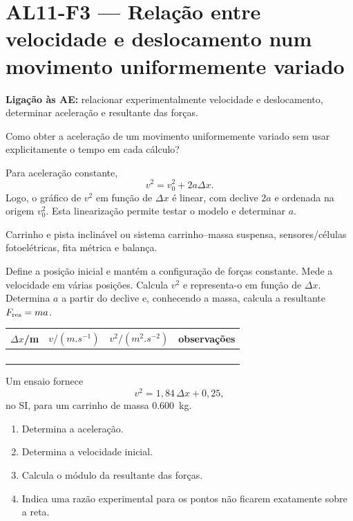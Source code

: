 \documentclass[11pt,a4paper,openany]{book}
\newcounter{exercicio}[chapter]
\renewcommand{\theexercicio}{\thechapter.\arabic{exercicio}}
\newenvironment{exercicio}[1][]%
{\refstepcounter{exercicio}%
\begin{tcolorbox}[breakable,colback=white,colframe=eublue!70,
 title={Exercício \theexercicio\if\relax\detokenize{#1}\relax\else\ --- #1\fi},fonttitle=\bfseries]}%
{\end{tcolorbox}}
\newcommand{\LigAE}[1]{\textbf{Ligação às AE:} #1}
\begin{document}
\section{AL11-F3 — Relação entre velocidade e deslocamento num movimento uniformemente variado}
\LigAE{relacionar experimentalmente velocidade e deslocamento, determinar aceleração e resultante das forças.}

\begin{questao}
Como obter a aceleração de um movimento uniformemente variado sem usar explicitamente o tempo em cada cálculo?
\end{questao}

\begin{fundamento}
Para aceleração constante,
\[
v^2=v_0^2+2a\Delta x.
\]
Logo, o gráfico de $v^2$ em função de $\Delta x$ é linear, com declive $2a$ e ordenada na origem $v_0^2$. Esta linearização permite testar o modelo e determinar $a$.
\end{fundamento}

\begin{material}
Carrinho e pista inclinável ou sistema carrinho--massa suspensa, sensores/células fotoelétricas, fita métrica e balança.
\end{material}

\begin{metodo}
Define a posição inicial e mantém a configuração de forças constante. Mede a velocidade em várias posições. Calcula $v^2$ e representa-o em função de $\Delta x$. Determina $a$ a partir do declive e, conhecendo a massa, calcula a resultante $F_{\rm res}=ma$.
\end{metodo}

\begin{registo}
\begin{center}
\begin{tabular}{@{}cccc@{}}
\toprule
$\Delta x$/m & $v/(\si{m.s^{-1}})$ & $v^2/(\si{m^2.s^{-2}})$ & observações\\
\midrule
& & &\\ & & &\\ & & &\\ & & &\\
\bottomrule
\end{tabular}
\end{center}
\end{registo}

\begin{exercicio}[Interpretar um ajuste]
Um ensaio fornece
\[
v^2=1,84\,\Delta x+0,25,
\]
no SI, para um carrinho de massa \SI{0.600}{kg}.
\begin{enumerate}[label=\alph*)]
\item Determina a aceleração.
\item Determina a velocidade inicial.
\item Calcula o módulo da resultante das forças.
\item Indica uma razão experimental para os pontos não ficarem exatamente sobre a reta.
\end{enumerate}
\end{exercicio}
\end{document}
